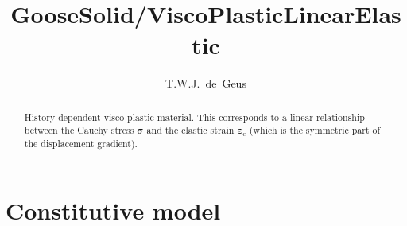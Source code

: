 \documentclass[times,namecite]{goose-article}
\title{%
  GooseSolid/ViscoPlasticLinearElastic
}
\author{T.W.J.~de~Geus}
\begin{document}
\maketitle

\begin{abstract}
History dependent visco-plastic material. This corresponds to a linear relationship between the Cauchy stress $\bm{\sigma}$ and the elastic strain $\bm{\varepsilon}_\mathrm{e}$ (which is the symmetric part of the displacement gradient).

\end{abstract}


\setcounter{tocdepth}{2}
\tableofcontents

\vfill\newpage
\section{Constitutive model}
\end{document}
